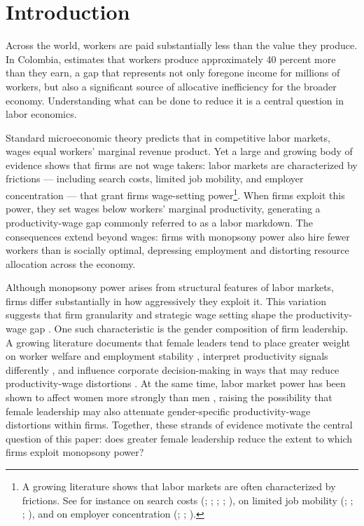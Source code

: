 \documentclass[12pt]{article}
\begin{document}
\newpage
\section{Introduction}

Across the world, workers are paid substantially less than the value they produce. In Colombia, \textcite{amodio_measuring_2024} estimates that workers produce approximately 40 percent more than they earn, a gap that represents not only foregone income for millions of workers, but also a significant source of allocative inefficiency for the broader economy. Understanding what can be done to reduce it is a central question in labor economics.

Standard microeconomic theory predicts that in competitive labor markets, wages equal workers' marginal revenue product. Yet a large and growing body of evidence shows that firms are not wage takers: labor markets are characterized by frictions --- including search costs, limited job mobility, and employer concentration --- that grant firms wage-setting power\footnote{A growing literature shows that labor markets are often characterized by frictions. See for  instance on search costs (\cite{card_who_2022}; \cite{azar_minimum_2019}; \cite{lentz_labor_2010}; \cite{moscarini_unemployment_2010}; \cite{manning_elusive_2021}), on limited job mobility (\cite{caldwell_outside_2024}; \cite{schubert_employer_2025}; \cite{starr_behavioral_2021}; \cite{mcadams_non-compete_2019}), and on employer concentration (\cite{azar_labor_2017}; \cite{benmelech_strong_2018}; \cite{rinz_labor_2022}).}. When firms exploit this power, they set wages below workers' marginal productivity, generating a productivity-wage gap commonly referred to as a labor markdown. The consequences extend beyond wages: firms with monopsony power also hire fewer workers than is socially optimal, depressing employment and distorting resource allocation across the economy.

Although monopsony power arises from structural features of labor markets, firms differ substantially in how aggressively they exploit it. This variation suggests that firm granularity and strategic wage setting shape the productivity-wage gap \textcite{berger_labor_2022}. One such characteristic is the gender composition of firm leadership. A growing literature documents that female leaders tend to place greater weight on worker welfare and employment stability \parencite{matsa_female_2013, tunyi_doing_2023}, interpret productivity signals differently \parencite{flabbi_female_2017, chen_why_2019}, and influence corporate decision-making in ways that may reduce productivity-wage distortions \parencite{levi_director_2014, flabbi_female_2019}. At the same time, labor market power has been shown to affect women more strongly than men \parencite{sharma_monopsony_2023}, raising the possibility that female leadership may also attenuate gender-specific productivity-wage distortions within firms. Together, these strands of evidence motivate the central question of this paper: does greater female leadership reduce the extent to which firms exploit monopsony power?
\end{document}
